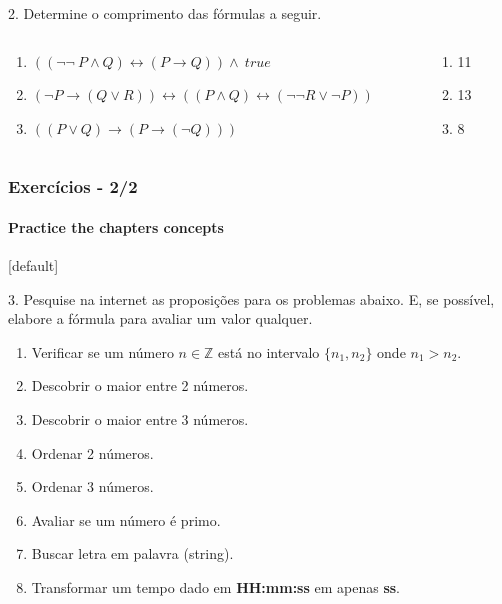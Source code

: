 \documentclass[10pt, headsepline, captions=tableabove, xcolor=table]{beamer}
\begin{document}
\begin{frame}[t]
\begin{exampleblock}{2. Determine o comprimento das fórmulas a seguir.}
\begin{columns}[T]
\begin{column}{0.8\textwidth}
                \begin{enumerate}[\bf a.]
                    \item $((\lnot \lnot~P \land Q) \leftrightarrow (P \rightarrow Q)) \land~true$
                    \item $(\lnot P \rightarrow (Q \lor R)) \leftrightarrow ((P \land Q) \leftrightarrow (\lnot \lnot R \lor \lnot P))$
                    \item $((P \lor Q) \rightarrow (P \rightarrow (\lnot Q)))$
                \end{enumerate}
            \end{column}
            \pause
            \begin{column}{0.2\textwidth}
                \begin{enumerate}[\bf a.]
                    \item 11
                    \item 13
                    \item 8
                \end{enumerate}
            \end{column}
        \end{columns}
    \end{exampleblock}
\end{frame}
%
\begin{frame}[t] %
    \frametitle{Exercícios - 2/2}
    \framesubtitle{Practice the chapters concepts}
    \small
    [default]
    \begin{exampleblock}{3. Pesquise na internet as proposições para os problemas abaixo.}
        E, se possível, elabore a fórmula para avaliar um valor qualquer.\\
        \begin{enumerate}[\bf P1.]
            \item Verificar se um número $n \in \mathbb{Z} $ está no intervalo $\{n_1, n_2\}$ onde $n_1 > n_2$.
            \item Descobrir o maior entre 2 números.
            \item Descobrir o maior entre 3 números.
            \item Ordenar 2 números.
            \item Ordenar 3 números.
            \item Avaliar se um número é primo.
            \item Buscar letra em palavra (string).
            \item Transformar um tempo dado em \textbf{HH:mm:ss} em apenas \textbf{ss}.
        \end{enumerate}
    \end{exampleblock}
    \normalsize
    \end{frame}
%
%
\end{document}
